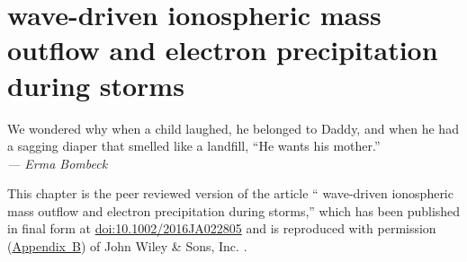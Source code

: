 
\chapter{\Alf wave-driven ionospheric mass outflow
and electron precipitation during storms}
\label{chp:2}

\begin{flushright}
  \begin{minipage}[]{0.5\linewidth}
    \begin{flushright}
      We wondered why when a child laughed, he belonged to Daddy, and when
      he had a sagging diaper that smelled like a landfill, ``He wants his mother.''  \\{\small \emph{--- Erma Bombeck} }
    \end{flushright}
  \end{minipage}
\end{flushright}
\vspace{\baselineskip}

This chapter is the peer reviewed version of the article ``\Alf
wave-driven ionospheric mass outflow and electron precipitation during
storms,'' which has been published in final form at
\href{https://doi.org/10.1002/2016JA022805}{doi:10.1002/2016JA022805}
and is reproduced with permission (\hyperref[app:B]{Appendix~B}) of
John Wiley \& Sons, Inc. .

